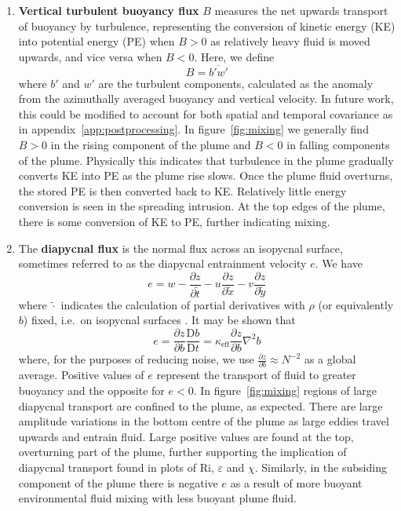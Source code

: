 \documentclass[a4paper]{article}
\begin{document}
\begin{enumerate}[label=(\alph*)]
	\item \textbf{Vertical turbulent buoyancy flux} $B$ measures the net upwards transport of buoyancy by
		turbulence, representing the conversion of kinetic energy (KE) into potential energy (PE) when $B > 0$
		as relatively heavy fluid is moved upwards, and vice versa when $B<0$. Here, we define
		\begin{equation}
			B = \overline{b'w'}
		\end{equation}
		where $b'$ and $w'$ are the turbulent components, calculated as the anomaly from the 
		azimuthally averaged buoyancy and vertical velocity. In future work, this could be modified to account
		for both spatial and temporal covariance as in appendix~\ref{app:postprocessing}. In
		figure~\ref{fig:mixing} we generally find $B > 0$ in the rising component of the plume and $B < 0$ in
		falling components of the plume. Physically this indicates that turbulence in the plume gradually
		converts KE into PE as the plume rise slows.  Once the plume fluid overturns, the stored PE is then
		converted back to KE.  Relatively little energy conversion is seen in the spreading intrusion. At the
		top edges of the plume, there is some conversion of KE to PE, further indicating mixing.

	\item The \textbf{diapycnal flux} is the normal flux across an isopycnal surface, sometimes referred to as
		the diapycnal entrainment velocity $e$. We have
		\begin{equation}
			e = w - \frac{\partial z}{\partial \tilde{t}} - u\frac{\partial z}{\partial\tilde{x}} -
			v\frac{\partial z}{\partial\tilde{y}}
		\end{equation}
		where $\tilde{\cdot}$ indicates the calculation of partial derivatives with $\rho$ (or equivalently $b$)
		fixed, i.e.\ on isopycnal surfaces \citep{deszoeke1993}. It may be shown that
		\begin{equation}
			e = \frac{\partial z}{\partial b}\frac{\mathrm{D}b}{\mathrm{D}t} = \kappa_{\text{eff}} \frac{\partial
				z}{\partial b}\nabla^2 b
		\end{equation}
		where, for the purposes of reducing noise, we use $\frac{\partial z}{\partial b} \approx N^{-2}$ as a
		global average. Positive values of $e$ represent the transport of fluid to greater buoyancy and the
		opposite for $e < 0$. In figure~\ref{fig:mixing} regions of large diapycnal transport are confined
		to the plume, as expected. There are large amplitude variations in the bottom centre of the plume as
		large eddies travel upwards and entrain fluid. Large positive values are found at the top, overturning
		part of the plume, further supporting the implication of diapycnal transport found in plots of
		$\mathrm{Ri}$, $\varepsilon$ and $\chi$. Similarly, in the subsiding component of the plume there is
		negative $e$ as a result of more buoyant environmental fluid mixing with less buoyant plume fluid.

\end{enumerate}
\end{document}
